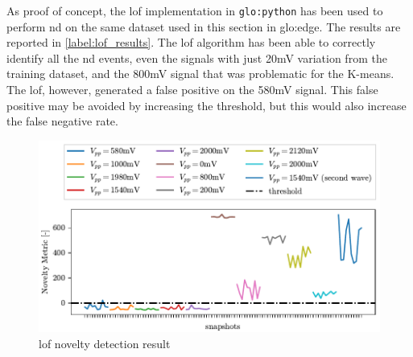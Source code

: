 As proof of concept, the \gls{lof} implementation in \texttt{\gls{glo:python}} has been used to perform \gls{nd} on the same dataset used in this section in \gls{glo:edge}. The results are reported in \autoref{label:lof_results}. The \gls{lof} algorithm has been able to correctly identify all the \gls{nd} events, even the signals with just 20mV variation from the training dataset, and the 800mV signal that was problematic for the K-means. The \gls{lof}, however, generated a false positive on the 580mV signal. This false positive may be avoided by increasing the threshold, but this would also increase the false negative rate. 

\begin{figure}
    \centering
    \includegraphics{Images/shaker/Test02_LOF.pdf}
    \caption{\gls{lof} novelty detection result}
    \label{fig:lof_results}
\end{figure}